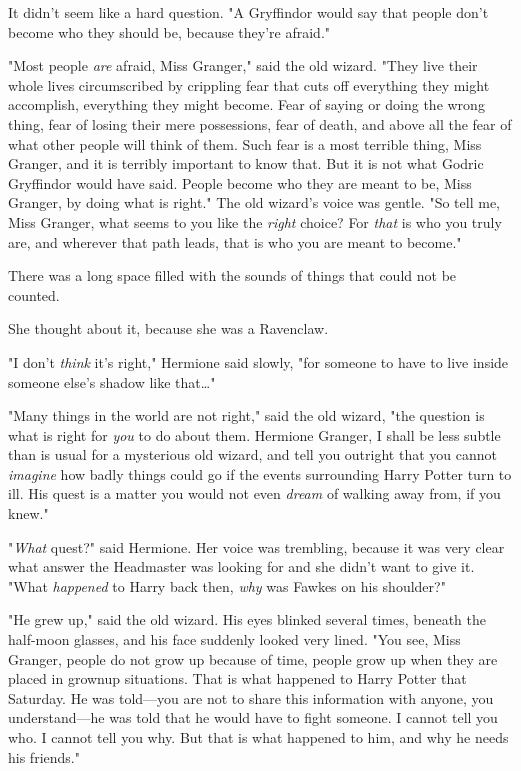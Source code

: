 It didn't seem like a hard question. "A Gryffindor would say that people don't 
become who they should be, because they're afraid."

"Most people \emph{are} afraid, Miss Granger," said the old wizard. "They live 
their whole lives circumscribed by crippling fear that cuts off everything they 
might accomplish, everything they might become. Fear of saying or doing the 
wrong thing, fear of losing their mere possessions, fear of death, and above 
all the fear of what other people will think of them. Such fear is a most 
terrible thing, Miss Granger, and it is terribly important to know that. But it 
is not what Godric Gryffindor would have said. People become who they are meant 
to be, Miss Granger, by doing what is right." The old wizard's voice was 
gentle. "So tell me, Miss Granger, what seems to you like the \emph{right} 
choice? For \emph{that} is who you truly are, and wherever that path leads, 
that is who you are meant to become."

There was a long space filled with the sounds of things that could not be 
counted.

She thought about it, because she was a Ravenclaw.

"I don't \emph{think} it's right," Hermione said slowly, "for someone to have 
to live inside someone else's shadow like that{\ldots}"

"Many things in the world are not right," said the old wizard, "the question is 
what is right for \emph{you} to do about them. Hermione Granger, I shall be 
less subtle than is usual for a mysterious old wizard, and tell you outright 
that you cannot \emph{imagine} how badly things could go if the events 
surrounding Harry Potter turn to ill. His quest is a matter you would not even 
\emph{dream} of walking away from, if you knew."

"\emph{What} quest?" said Hermione. Her voice was trembling, because it was 
very clear what answer the Headmaster was looking for and she didn't want to 
give it. "What \emph{happened} to Harry back then, \emph{why} was Fawkes on his 
shoulder?"

"He grew up," said the old wizard. His eyes blinked several times, beneath the 
half-moon glasses, and his face suddenly looked very lined. "You see, Miss 
Granger, people do not grow up because of time, people grow up when they are 
placed in grownup situations. That is what happened to Harry Potter that 
Saturday. He was told---you are not to share this information with anyone, you 
understand---he was told that he would have to fight someone. I cannot tell you 
who. I cannot tell you why. But that is what happened to him, and why he needs 
his friends."

